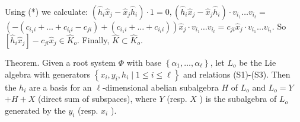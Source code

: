 \documentclass[10pt]{article}
\begin{document}
Using (*) we calculate: $\left(\hat{h}_{i} \hat{x}_{j}-\hat{x}_{j} \hat{h}_{i}\right) \cdot 1=0,\left(\hat{h}_{i} \hat{x}_{j}-\hat{x}_{j} \hat{h}_{i}\right) \cdot v_{i_{1}} \ldots v_{i_{t}}=$ $\left(-\left(c_{i_{1} i}+\ldots+c_{i_{t} i}-c_{j i}\right)+\left(c_{i_{1} i}+\ldots+c_{i_{t} i}\right)\right) \hat{x}_{j} \cdot v_{i_{1}} \ldots v_{i_{t}}=c_{j i} \hat{x}_{j} \cdot v_{i_{1}} \ldots v_{i_{t}}$. So $\left[\hat{h}_{i} \hat{x}_{j}\right]-c_{j l} \hat{x}_{j} \in \hat{K}_{o}$. Finally, $\hat{K} \subset \hat{K}_{o}$.

Theorem. Given a root system $\Phi$ with base $\left\{\alpha_{1}, \ldots, \alpha_{\ell}\right\}$, let $L_{o}$ be the Lie\\
algebra with generators $\left\{x_{i}, y_{i}, h_{i} \mid 1 \leq i \leq \ell\right\}$ and relations (S1)-(S3). Then the $h_{i}$ are a basis for an $\ell$-dimensional abelian subalgebra $H$ of $L_{o}$ and $L_{o}=Y$ $+H+X$ (direct sum of subspaces), where $Y$ (resp. $X$ ) is the subalgebra of $L_{o}$ generated by the $y_{i}$ (resp. $x_{i}$ ).
\end{document}
